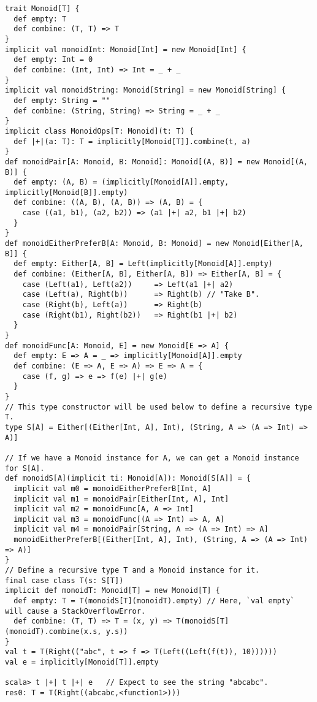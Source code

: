 \begin{lstlisting}[frame=single,fillcolor={\color{black}},framesep={0.2mm},framexleftmargin=2mm,framexrightmargin=2mm,framextopmargin=2mm,framexbottommargin=2mm]
trait Monoid[T] {
  def empty: T
  def combine: (T, T) => T
}
implicit val monoidInt: Monoid[Int] = new Monoid[Int] {
  def empty: Int = 0
  def combine: (Int, Int) => Int = _ + _
}
implicit val monoidString: Monoid[String] = new Monoid[String] {
  def empty: String = ""
  def combine: (String, String) => String = _ + _
}
implicit class MonoidOps[T: Monoid](t: T) {
  def |+|(a: T): T = implicitly[Monoid[T]].combine(t, a)
}
def monoidPair[A: Monoid, B: Monoid]: Monoid[(A, B)] = new Monoid[(A, B)] {
  def empty: (A, B) = (implicitly[Monoid[A]].empty, implicitly[Monoid[B]].empty)
  def combine: ((A, B), (A, B)) => (A, B) = {
    case ((a1, b1), (a2, b2)) => (a1 |+| a2, b1 |+| b2)
  }
}
def monoidEitherPreferB[A: Monoid, B: Monoid] = new Monoid[Either[A, B]] {
  def empty: Either[A, B] = Left(implicitly[Monoid[A]].empty)
  def combine: (Either[A, B], Either[A, B]) => Either[A, B] = {
    case (Left(a1), Left(a2))     => Left(a1 |+| a2)
    case (Left(a), Right(b))      => Right(b) // "Take B".
    case (Right(b), Left(a))      => Right(b)
    case (Right(b1), Right(b2))   => Right(b1 |+| b2)
  }
}
def monoidFunc[A: Monoid, E] = new Monoid[E => A] {
  def empty: E => A = _ => implicitly[Monoid[A]].empty
  def combine: (E => A, E => A) => E => A = {
    case (f, g) => e => f(e) |+| g(e)
  }
}
// This type constructor will be used below to define a recursive type T.
type S[A] = Either[(Either[Int, A], Int), (String, A => (A => Int) => A)]

// If we have a Monoid instance for A, we can get a Monoid instance for S[A].
def monoidS[A](implicit ti: Monoid[A]): Monoid[S[A]] = {
  implicit val m0 = monoidEitherPreferB[Int, A]
  implicit val m1 = monoidPair[Either[Int, A], Int]
  implicit val m2 = monoidFunc[A, A => Int]
  implicit val m3 = monoidFunc[(A => Int) => A, A]
  implicit val m4 = monoidPair[String, A => (A => Int) => A]
  monoidEitherPreferB[(Either[Int, A], Int), (String, A => (A => Int) => A)]
}
// Define a recursive type T and a Monoid instance for it.
final case class T(s: S[T])
implicit def monoidT: Monoid[T] = new Monoid[T] {
  def empty: T = T(monoidS[T](monoidT).empty) // Here, `val empty` will cause a StackOverflowError.
  def combine: (T, T) => T = (x, y) => T(monoidS[T](monoidT).combine(x.s, y.s))
}
val t = T(Right(("abc", t => f => T(Left((Left(f(t)), 10))))))
val e = implicitly[Monoid[T]].empty

scala> t |+| t |+| e   // Expect to see the string "abcabc".
res0: T = T(Right((abcabc,<function1>)))
\end{lstlisting}

